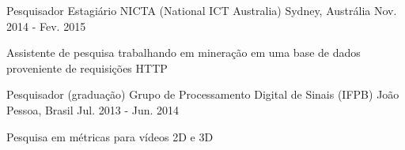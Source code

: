 \begin{cventries}
  \cventry
    {Pesquisador Estagiário} %
    {NICTA (National ICT Australia)} %
    {Sydney, Austrália} %
    {Nov. 2014 - Fev. 2015} %
    {
      \begin{cvitems} %
        \item {Assistente de pesquisa trabalhando em mineração em uma base de dados proveniente de requisições HTTP}
      \end{cvitems}
    }
  
  \cventry
    {Pesquisador (graduação)} %
    {Grupo de Processamento Digital de Sinais (IFPB)} %
    {João Pessoa, Brasil} %
    {Jul. 2013 - Jun. 2014} %
    {
      \begin{cvitems} %
	    \item {Pesquisa em métricas para vídeos 2D e 3D}
      \end{cvitems}
    }
\end{cventries}
